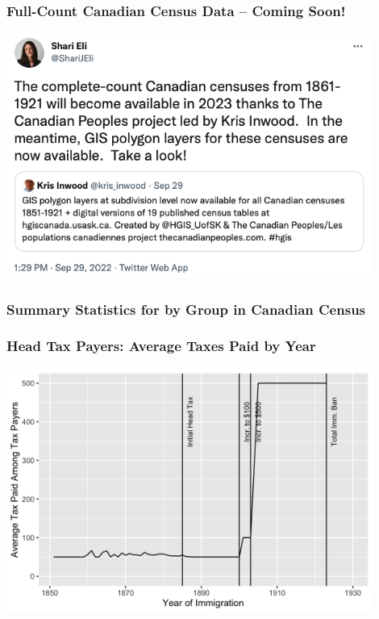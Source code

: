 \documentclass[pdf]{beamer}
\begin{document}
\begin{frame}[label=censustweet]
    \frametitle{Full-Count Canadian Census Data -- Coming Soon!}
    \includegraphics[width = 0.9\textwidth]{../../figs/census_tweet.png}
    \hyperlink{datasources}{}
\end{frame}

\begin{frame}[label = summstatscensus]
	\frametitle{Summary Statistics for by Group in Canadian Census}
	\begin{table}[H]
        \centering 
		\resizebox{0.6\textwidth}{!}{
            
		}
	\end{table}  
    \hyperlink{datasources}{}
\end{frame}

\begin{frame}[label=taxespaid]
    \frametitle{Head Tax Payers: Average Taxes Paid by Year}
    \centering
    \includegraphics[width = 0.9\textwidth]{../../figs/taxespaid.png}
    \centering
    \hyperlink{yrimmchi}{}
\end{frame}
\end{document}
